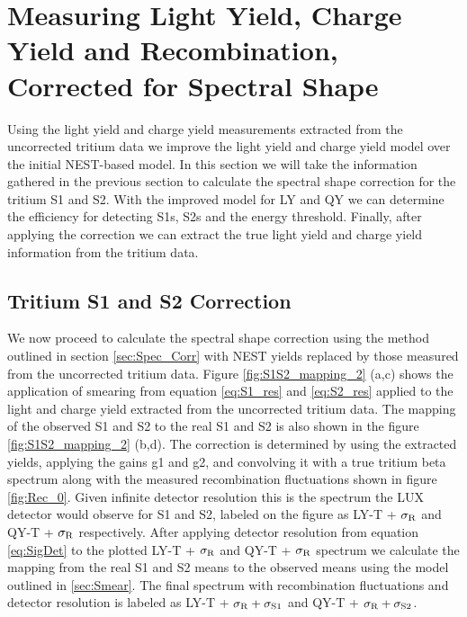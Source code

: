 \newpage

\section{Measuring Light Yield, Charge Yield and Recombination, Corrected for Spectral Shape}

Using the light yield and charge yield measurements extracted from the uncorrected tritium data we improve the light yield and charge yield model over the initial NEST-based model. In this section we will take the information gathered in the previous section to calculate the spectral shape correction for the tritium S1 and S2. With the improved model for LY and QY we can determine the efficiency for detecting S1s, S2s and the energy threshold. Finally, after applying the correction we can extract the true light yield and charge yield information from the tritium data.

\subsection{Tritium S1 and S2 Correction}

We now proceed to calculate the spectral shape correction using the method outlined in section \ref{sec:Spec_Corr} with NEST yields replaced by those measured from the uncorrected tritium data. Figure \ref{fig:S1S2_mapping_2} (a,c) shows the application of smearing from equation \ref{eq:S1_res} and \ref{eq:S2_res} applied to the light and charge yield extracted from the uncorrected tritium data. The mapping of the observed S1 and S2 to the real S1 and S2 is also shown in the figure \ref{fig:S1S2_mapping_2} (b,d). The correction is determined by using the extracted yields, applying the gains g1 and g2, and convolving it with a true tritium beta spectrum along with the measured recombination fluctuations shown in figure \ref{fig:Rec_0}. Given infinite detector resolution this is the spectrum the LUX detector would observe for S1 and S2, labeled on the figure as LY-T + $\rm \sigma_R$ and QY-T + $\rm \sigma_R$ respectively. After applying detector resolution from equation \ref{eq:SigDet} to the plotted LY-T + $\rm \sigma_R$ and QY-T + $\rm \sigma_R$ spectrum we calculate the mapping from the real S1 and S2 means to the observed means using the model outlined in \ref{sec:Smear}. The final spectrum with recombination fluctuations and detector resolution is labeled as LY-T + $\rm \sigma_R + \sigma_{S1}$ and QY-T + $\rm \sigma_R + \sigma_{S2}$.


